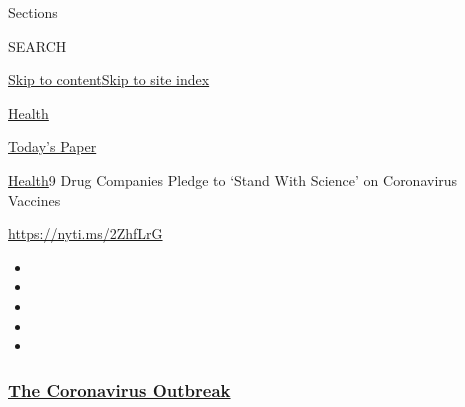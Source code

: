 Sections

SEARCH

\protect\hyperlink{site-content}{Skip to
content}\protect\hyperlink{site-index}{Skip to site index}

\href{https://www.nytimes3xbfgragh.onion/section/health}{Health}

\href{https://myaccount.nytimes3xbfgragh.onion/auth/login?response_type=cookie\&client_id=vi}{}

\href{https://www.nytimes3xbfgragh.onion/section/todayspaper}{Today's
Paper}

\href{/section/health}{Health}\textbar{}9 Drug Companies Pledge to
`Stand With Science' on Coronavirus Vaccines

\url{https://nyti.ms/2ZhfLrG}

\begin{itemize}
\item
\item
\item
\item
\item
\end{itemize}

\hypertarget{the-coronavirus-outbreak}{%
\subsubsection{\texorpdfstring{\href{https://www.nytimes3xbfgragh.onion/news-event/coronavirus?name=styln-coronavirus-national\&region=TOP_BANNER\&block=storyline_menu_recirc\&action=click\&pgtype=Article\&impression_id=29b8b810-f528-11ea-8964-d1c7703f36aa\&variant=undefined}{The
Coronavirus
Outbreak}}{The Coronavirus Outbreak}}\label{the-coronavirus-outbreak}}

